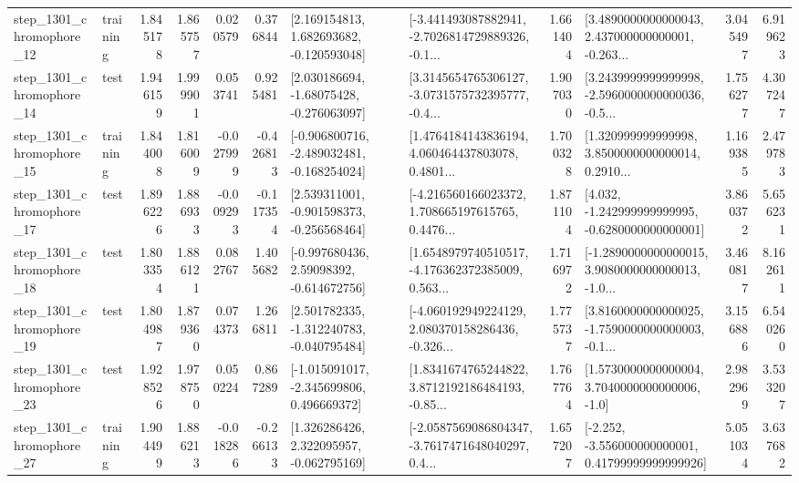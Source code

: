 \begin{tabular}{llrrrrllrlrr}
 step\_1301\_chromophore\_12 &  training &      1.845178 &    1.865757 &      0.020579 &  0.376844 &    [2.169154813, 1.682693682, -0.120593048] &  [-3.441493087882941, -2.7026814729889326, -0.1... &       1.661404 &  [3.4890000000000043, 2.437000000000001, -0.263... &            3.045497 &          6.919623 \\
 step\_1301\_chromophore\_14 &      test &      1.946159 &    1.999901 &      0.053741 &  0.925481 &    [2.030186694, -1.68075428, -0.276063097] &  [3.3145654765306127, -3.0731575732395777, -0.4... &       1.907030 &  [3.2439999999999998, -2.5960000000000036, -0.5... &            1.756277 &          4.307247 \\
 step\_1301\_chromophore\_15 &  training &      1.844008 &    1.816009 &     -0.027999 & -0.426813 &  [-0.906800716, -2.489032481, -0.168254024] &  [1.4764184143836194, 4.060464437803078, 0.4801... &       1.700328 &  [1.320999999999998, 3.8500000000000014, 0.2910... &            1.169385 &          2.479783 \\
 step\_1301\_chromophore\_17 &      test &      1.896226 &    1.886933 &     -0.009293 & -0.117354 &   [2.539311001, -0.901598373, -0.256568464] &  [-4.216560166023372, 1.708665197615765, 0.4476... &       1.871104 &   [4.032, -1.242999999999995, -0.6280000000000001] &            3.860372 &          5.656231 \\
 step\_1301\_chromophore\_18 &      test &      1.803354 &    1.886121 &      0.082767 &  1.405682 &    [-0.997680436, 2.59098392, -0.614672756] &  [1.6548979740510517, -4.176362372385009, 0.563... &       1.716972 &  [-1.2890000000000015, 3.9080000000000013, -1.0... &            3.460817 &          8.162611 \\
 step\_1301\_chromophore\_19 &      test &      1.804987 &    1.879360 &      0.074373 &  1.266811 &   [2.501782335, -1.312240783, -0.040795484] &  [-4.060192949224129, 2.080370158286436, -0.326... &       1.775737 &  [3.8160000000000025, -1.7590000000000003, -0.1... &            3.156886 &          6.540260 \\
 step\_1301\_chromophore\_23 &      test &      1.928526 &    1.978750 &      0.050224 &  0.867289 &   [-1.015091017, -2.345699806, 0.496669372] &  [1.8341674765244822, 3.8712192186484193, -0.85... &       1.767764 &     [1.5730000000000004, 3.7040000000000006, -1.0] &            2.982969 &          3.533207 \\
 step\_1301\_chromophore\_27 &  training &      1.904499 &    1.886213 &     -0.018286 & -0.266133 &    [1.326286426, 2.322095957, -0.062795169] &  [-2.0587569086804347, -3.7617471648040297, 0.4... &       1.657207 &  [-2.252, -3.556000000000001, 0.41799999999999926] &            5.051034 &          3.637682 \\

\end{tabular}
